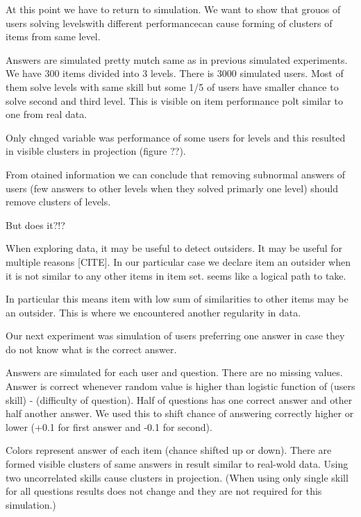 \documentclass[
  digital, %
  table,   %
  nolof,     %
  nolot,     %
  nocover
]{fithesis3}
\begin{document}
At this point we have to return to simulation. We want to show that
grouos of users solving levelswith different performancecan cause
forming of clusters of items from same level.

Answers are simulated pretty mutch same as in previous simulated
experiments. We have 300 items divided into 3 levels. There is 3000
simulated users. Most of them solve levels with same skill but some 1/5
of users have smaller chance to solve second and third level. This is
visible on item performance polt similar to one from real data.

Only chnged variable was performance of some users for levels and this
resulted in visible clusters in projection (figure ??).

From otained information we can conclude that removing subnormal answers
of users (few answers to other levels when they solved primarly one
level) should remove clusters of levels.

But does it?!?




When exploring data, it may be useful to detect outsiders. It may be
useful for multiple reasons [CITE]. In our particular case we
declare item an outsider when it is not similar to any other items in
item set. seems like a logical path to take.

In particular this means item with low sum of similarities to other
items may be an outsider. This is where we encountered another
regularity in data.


Our next experiment was simulation of users preferring one answer in
case they do not know what is the correct answer.

Answers are simulated for each user and question. There are no missing
values. Answer is correct whenever random value is higher than logistic
function of (users skill) - (difficulty of question). Half of questions
has one correct answer and other half another answer. We used this to
shift chance of answering correctly higher or lower (+0.1 for first
answer and -0.1 for second).


Colors represent answer of each item (chance shifted up or down). There
are formed visible clusters of same answers in result similar to
real-wold data. Using two uncorrelated skills cause clusters in
projection. (When using only single skill for all questions results does
not change and they are not required for this simulation.)
\end{document}
